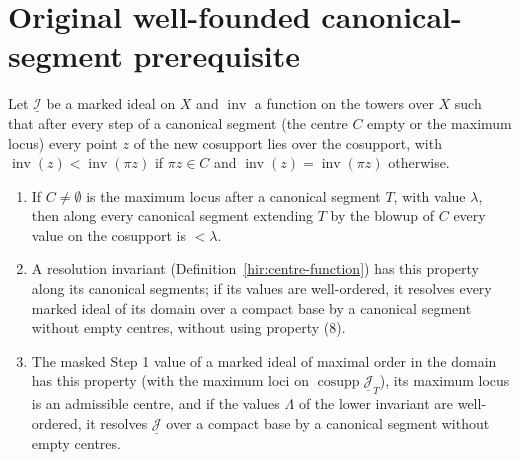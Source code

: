 \section{Original well-founded canonical-segment prerequisite}

\begin{theorem}
\label{hir:step-one-well-founded}
\mixedleanok
Let \(\underline{\mathcal I}\) be a marked ideal on \(X\) and \(\operatorname{inv}\) a function on the towers over \(X\) such that after every step of a canonical segment
(the centre \(C\) empty or the maximum locus) every point \(z\) of the new cosupport lies over the cosupport, with \(\operatorname{inv}(z)<\operatorname{inv}(\pi z)\) if
\(\pi z\in C\) and \(\operatorname{inv}(z)=\operatorname{inv}(\pi z)\) otherwise.
\begin{enumerate}
\item If \(C\neq\emptyset\) is the maximum locus after a canonical segment \(T\), with value \(\lambda\), then along every canonical segment extending \(T\) by the blowup of
\(C\) every value on the cosupport is \(<\lambda\).
\item A resolution invariant (Definition~\ref{hir:centre-function}) has this property along its canonical segments; if its values are well-ordered, it resolves every
marked ideal of its domain over a compact base by a canonical segment without empty centres, without using property (8).
\item The masked Step 1 value of a marked ideal of maximal order in the domain has this property (with the maximum loci on \(\operatorname{cosupp}\underline{\mathcal J}_T\)),
its maximum locus is an admissible centre, and if the values \(\Lambda\) of the lower invariant are well-ordered, it resolves \(\underline{\mathcal J}\) over a compact base
by a canonical segment without empty centres.
\end{enumerate}
\end{theorem}

